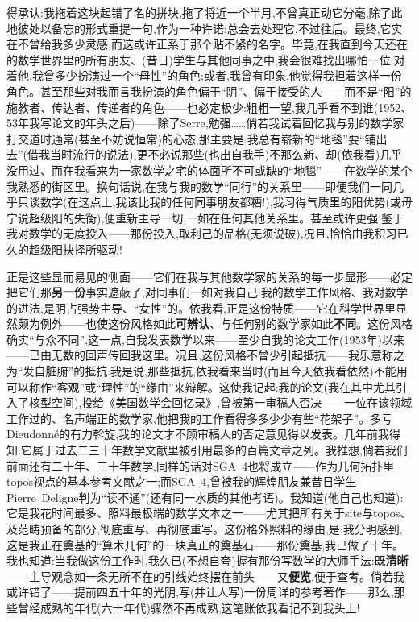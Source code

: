 得承认:我拖着这块起错了名的拼块,拖了将近一个半月,不曾真正动它分毫,除了此地彼处以备忘的形式重提一句,作为一种许诺:总会去处理它,不过往后。最终,它实在不曾给我多少灵感;而这或许正系于那个贴不紧的名字\dmark{}。毕竟,在我直到今天还在的数学世界里的所有朋友、(昔日)学生与其他同事之中,我会很难找出哪怕一位:对着他,我曾多少扮演过一个“母性”的角色;或者,我曾有印象,他觉得我担着这样一份角色。甚至那些对我而言我扮演的角色偏于“阴”、偏于接受的人——而不是“阳”的施教者、传达者、传递者的角色——也必定极少:粗粗一望,我几乎看不到谁(1952、53年我写论文的年头之后)——除了Serre,勉强……倘若我试着回忆我与别的数学家打交道时通常(甚至不妨说恒常)的心态,那主要是:我总有崭新的“地毯”要“铺出去”(借我当时流行的说法),更不必说那些(也出自我手)不那么新、却(依我看)几乎没用过、而在我看来为一家数学之宅的体面所不可或缺的“地毯”——在数学的某个我熟悉的街区里。换句话说,在我与我的数学“同行”的关系里——即便我们一同几乎只谈数学(在这点上,我该比我的任何同事朋友都糟!),我习得气质里的阳优势(或毋宁说超级阳的失衡),便重新主导一切,一如在任何其他关系里。甚至或许更强,鉴于我对数学的无度投入——那份投入,取利己的品格(无须说破),况且,恰恰由我积习已久的超级阳抉择所驱动!

正是这些显而易见的侧面——它们在我与其他数学家的关系的每一步显形——必定把它们那\textbf{另一份}事实遮蔽了,对同事们一如对我自己:我的数学工作风格、我对数学的进法,是阴占强势主导、“女性”的。依我看,正是这份特质——它在科学世界里显然颇为例外——也使这份风格如此\textbf{可辨认}、与任何别的数学家如此\textbf{不同}。这份风格确实“与众不同”,这一点,自我发表数学以来——至少自我的论文工作(1953年)以来——已由无数的回声传回我这里。况且,这份风格不曾少引起抵抗——我乐意称之为“发自脏腑”的抵抗:我是说,那些抵抗,依我看来当时(而且今天依我看依然)不能用可以称作“客观”或“理性”的“缘由”来辩解。这使我记起:我的论文(我在其中尤其引入了核型空间),投给《美国数学会回忆录》,曾被第一审稿人否决——一位在该领域工作过的、名声端正的数学家,他把我的工作看得多多少少有些“花架子”。多亏Dieudonné的有力斡旋,我的论文才不顾审稿人的否定意见得以发表。几年前我得知:它属于过去二三十年数学文献里被引用最多的百篇文章之列。我推想,倘若我们前面还有二十年、三十年数学,同样的话对SGA~4也将成立——作为几何拓扑里topos视点的基本参考文献之一;而SGA~4,曾被我的辉煌朋友兼昔日学生Pierre~Deligne判为“读不通”(还有同一水质的其他考语)。我知道(他自己也知道):它是我花时间最多、照料最极端的数学文本之一——尤其把所有关于site与topos、及范畴预备的部分,彻底重写、再彻底重写。这份格外照料的缘由,是:我分明感到,这是我正在奠基的“算术几何”的一块真正的奠基石——那份奠基,我已做了十年。我也知道:当我做这份工作时,我久已(不想自夸)握有那份写数学的大师手法:既\textbf{清晰}——主导观念如一条无所不在的引线始终摆在前头——又\textbf{便览},便于查考。倘若我或许错了——提前四五十年的光阴,写(并让人写)一份周详的参考著作——那么,那些曾经成熟的年代(六十年代)骤然不再成熟,这笔账依我看记不到我头上!

